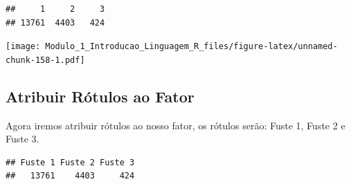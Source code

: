 \documentclass[
]{article}
\newenvironment{Shaded}{\begin{snugshade}}{\end{snugshade}}
\newcommand{\AttributeTok}[1]{\textcolor[rgb]{0.77,0.63,0.00}{#1}}
\newcommand{\CommentTok}[1]{\textcolor[rgb]{0.56,0.35,0.01}{\textit{#1}}}
\newcommand{\ConstantTok}[1]{\textcolor[rgb]{0.00,0.00,0.00}{#1}}
\newcommand{\DecValTok}[1]{\textcolor[rgb]{0.00,0.00,0.81}{#1}}
\newcommand{\FunctionTok}[1]{\textcolor[rgb]{0.00,0.00,0.00}{#1}}
\newcommand{\NormalTok}[1]{#1}
\newcommand{\OtherTok}[1]{\textcolor[rgb]{0.56,0.35,0.01}{#1}}
\newcommand{\SpecialCharTok}[1]{\textcolor[rgb]{0.00,0.00,0.00}{#1}}
\newcommand{\StringTok}[1]{\textcolor[rgb]{0.31,0.60,0.02}{#1}}
\begin{document}
\begin{verbatim}
##     1     2     3 
## 13761  4403   424
\end{verbatim}

\begin{Shaded}
\end{Shaded}

\texttt{[image: Modulo\_1\_Introducao\_Linguagem\_R\_files/figure-latex/unnamed-chunk-158-1.pdf]}

\hypertarget{atribuir-ruxf3tulos-ao-fator}{%
\subsection{Atribuir Rótulos ao
Fator}\label{atribuir-ruxf3tulos-ao-fator}}

Agora iremos atribuir rótulos ao nosso fator, os rótulos serão: Fuste 1,
Fuste 2 e Fuste 3.

\begin{Shaded}
\end{Shaded}

\begin{Shaded}
\end{Shaded}

\begin{verbatim}
## Fuste 1 Fuste 2 Fuste 3 
##   13761    4403     424
\end{verbatim}
\end{document}
